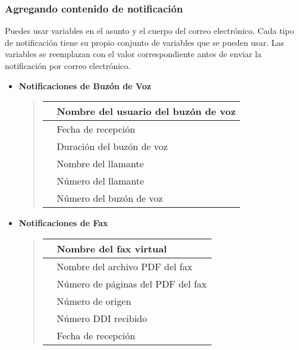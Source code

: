 \documentclass[letterpaper,10pt,spanish]{sphinxmanual}
\begin{document}
\subsubsection{Agregando contenido de notificación}
\label{administration_portal/brand/settings/notification_templates:using-variables-in-notification-contents}
Puedes usar variables en el asunto y el cuerpo del correo electrónico. Cada tipo de notificación tiene su propio conjunto de variables que se pueden usar. Las variables se reemplazan con el valor correspondiente antes de enviar la notificación por correo electrónico.
\begin{itemize}
\item {} 
\textbf{Notificaciones de Buzón de Voz}
\begin{quote}

\noindent\begin{tabulary}{\linewidth}{|L|L|}
\hline

&
Nombre del usuario del buzón de voz
\\
\hline
{}
&
Fecha de recepción
\\
\hline
{}
&
Duración del buzón de voz
\\
\hline
{}
&
Nombre del llamante
\\
\hline
{}
&
Número del llamante
\\
\hline
{}
&
Número del buzón de voz
\\
\hline\end{tabulary}

\end{quote}

\item {} 
\textbf{Notificaciones de Fax}
\begin{quote}

\noindent\begin{tabulary}{\linewidth}{|L|L|}
\hline

&
Nombre del fax virtual
\\
\hline
{}
&
Nombre del archivo PDF del fax
\\
\hline
{}
&
Número de páginas del PDF del fax
\\
\hline
{}
&
Número de origen
\\
\hline
{}
&
Número DDI recibido
\\
\hline
{}
&
Fecha de recepción
\\
\hline\end{tabulary}


\end{quote}
\end{itemize}
\end{document}
